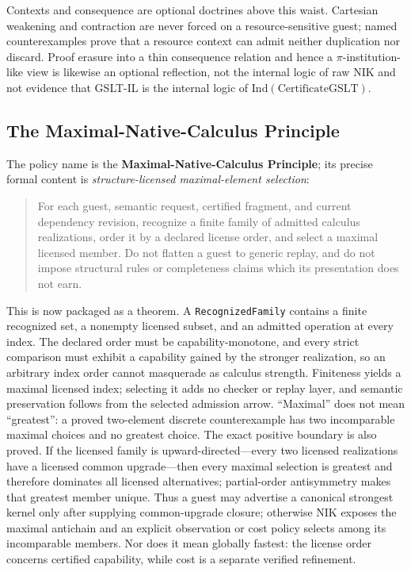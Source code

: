 \documentclass[11pt]{article}
\newcommand{\NIK}{NIK}
\newcommand{\code}[1]{\texttt{#1}}
\begin{document}
Contexts and consequence are optional doctrines above this waist.  Cartesian
weakening and contraction are never forced on a resource-sensitive guest; named
counterexamples prove that a resource context can admit neither duplication nor
discard.  Proof erasure into a thin consequence relation and hence a
$\pi$-institution-like view is likewise an optional reflection, not the internal
logic of raw \NIK{} and not evidence that GSLT-IL is the internal logic of
$\mathrm{Ind}(\mathrm{CertificateGSLT})$.

\subsection{The Maximal-Native-Calculus Principle}

The policy name is the \textbf{Maximal-Native-Calculus Principle}; its precise
formal content is \emph{structure-licensed maximal-element selection}:

\begin{quote}
For each guest, semantic request, certified fragment, and current dependency
revision, recognize a finite family of admitted calculus realizations, order it
by a declared license order, and select a maximal licensed member.  Do not
flatten a guest to generic replay, and do not impose structural rules or
completeness claims which its presentation does not earn.
\end{quote}

This is now packaged as a theorem.  A \code{RecognizedFamily} contains a finite
recognized set, a nonempty licensed subset, and an admitted operation at every
index.  The declared order must be capability-monotone, and every strict
comparison must exhibit a capability gained by the stronger realization, so an
arbitrary index order cannot masquerade as calculus strength.  Finiteness yields
a maximal licensed index; selecting it adds no checker
or replay layer, and semantic preservation follows from the selected admission
arrow.  ``Maximal'' does not mean ``greatest'': a proved two-element discrete
counterexample has two incomparable maximal choices and no greatest choice.
The exact positive boundary is also proved.  If the licensed family is
upward-directed---every two licensed realizations have a licensed common
upgrade---then every maximal selection is greatest and therefore dominates all
licensed alternatives; partial-order antisymmetry makes that greatest member
unique.  Thus a guest may advertise a canonical strongest
kernel only after supplying common-upgrade closure; otherwise NIK exposes the
maximal antichain and an explicit observation or cost policy selects among its
incomparable members.  Nor does it mean globally fastest: the license order
concerns certified capability, while cost is a separate verified refinement.
\end{document}
